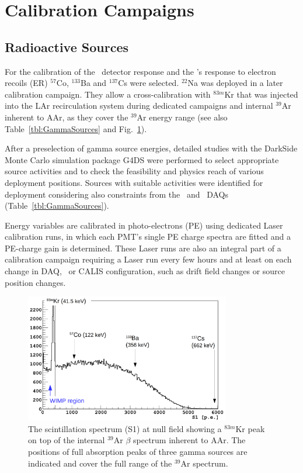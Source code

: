 \section{Calibration Campaigns}\label{sec:CalibCampaigns}
\subsection{Radioactive Sources}
For the calibration of the \lsv\ detector response and the \tpc's response to electron recoils (ER) $^{57}$Co, $^{133}$Ba and $^{137}$Cs were selected. $^{22}$Na was deployed in a later calibration campaign. They allow a cross-calibration with $^{83m}$Kr that was injected into the LAr recirculation system during dedicated campaigns and internal $^{39}$Ar inherent to AAr, as they cover the $^{39}$Ar energy range (see also Table~\ref{tbl:GammaSources} and Fig.~\ref{fig:GammaSources_Ar39spectrum}). %

After a preselection of gamma source energies, detailed studies with the DarkSide Monte Carlo simulation package G4DS \cite{DS50:G4DS:paper} were performed to select appropriate source activities and to check the feasibility and physics reach of various deployment positions. Sources with suitable activities were identified for deployment considering also constraints from the \lsv\ and \tpc\ DAQs (Table~\ref{tbl:GammaSources}).

Energy variables are calibrated in photo-electrons (PE) using dedicated Laser calibration runs, in which each PMT's single PE charge spectra are fitted and a PE-charge gain is determined. 
These Laser runs are also an integral part of a calibration campaign requiring a Laser run every few hours and at least on each change in DAQ, \tpc\ or CALIS configuration, such as drift field changes or source position changes.

\begin{figure}[htbp]
 \centering
 \includegraphics[width=0.8\textwidth]{Figures/GammaSources_Ar39spectrum.png}
 \caption{The scintillation spectrum (S1) at null field showing a $^{83m}$Kr peak on top of the internal $^{39}$Ar $\beta$ spectrum inherent to AAr. The positions of full absorption peaks of three gamma sources are indicated and cover the full range of the $^{39}$Ar spectrum.
\label{fig:GammaSources_Ar39spectrum}}
\end{figure}

